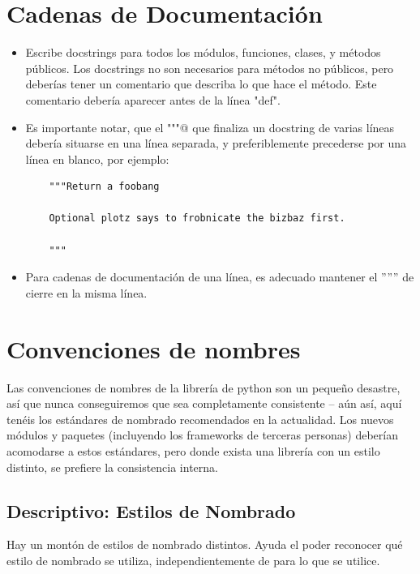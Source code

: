 \documentclass[a4paper,11pt,oneside]{book}
\begin{document}
\section{Cadenas de Documentación}
\begin{itemize}
\item Escribe docstrings para todos los módulos, funciones, clases, y métodos públicos. Los docstrings no son necesarios para métodos no públicos, pero deberías tener un comentario que describa lo que hace el método. Este comentario debería aparecer antes de la línea "def".
\item Es importante notar, que el \verb@"""@ que finaliza un docstring de varias líneas debería situarse en una línea separada, y preferiblemente precederse por una línea en blanco, por ejemplo:

\begin{lstlisting}
    """Return a foobang

    Optional plotz says to frobnicate the bizbaz first.

    """
\end{lstlisting}
\item Para cadenas de documentación de una línea, es adecuado mantener el '''''' de cierre en la misma línea.
\end{itemize}
\section{Convenciones de nombres}
Las convenciones de nombres de la librería de python son un pequeño desastre, así que nunca conseguiremos que sea completamente consistente -- aún así, aquí tenéis los estándares de nombrado recomendados en la actualidad. Los nuevos módulos y paquetes (incluyendo los frameworks de terceras personas) deberían acomodarse a estos estándares, pero donde exista una librería con un estilo distinto, se prefiere la consistencia interna.
\subsection{Descriptivo: Estilos de Nombrado}
Hay un montón de estilos de nombrado distintos. Ayuda el poder reconocer qué estilo de nombrado se utiliza, independientemente de para lo que se utilice.
\end{document}
